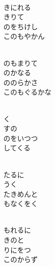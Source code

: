 \documentclass[10pt,b5j]{tarticle} %
\begin{document}
\begin{enumerate}
\begin{minipage}[c]{\blocksize}
        \vspace{\linespace}
        \item~\\
        きにれる\\
        きりて\\
        のをちけし\\
        このもやかん
        
        \vspace{\linespace}
        \item~\\
        のもまりて\\
        のかなる\\
        ののらかさ\\
        このもぐるかな
        
        \vspace{\linespace}
        \item~\\
        く\\
        すの\\
        のをいつつ\\
        してくる
        
        \vspace{\linespace}
        \item~\\
        たるに\\
        うく\\
        たきめんと\\
        もなくをく
        
        \vspace{\linespace}
        \item~\\
        もれるに\\
        きのと\\
        りにをつ\\
        このからず
    
    \end{minipage}
\end{enumerate} %
\end{document}
